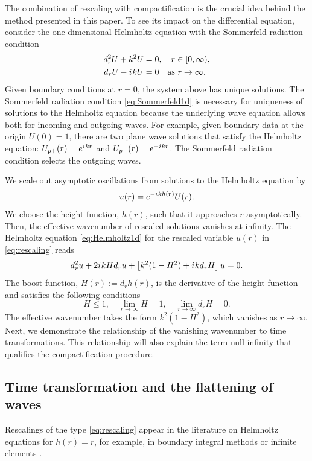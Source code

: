 \documentclass[draft,onefignum,onetabnum]{siamart190516}
\newcommand{\be}{\begin{equation}}
\newcommand{\ee}{\end{equation}}
\newcommand{\iu}{{i\mkern1mu}}
\begin{document}
The combination of rescaling with compactification is the crucial idea behind the method presented in this paper. To see its impact on the differential equation, consider the one-dimensional Helmholtz equation with the Sommerfeld radiation condition
\begin{align}
\label {eq:Helmholtz1d} d_r^2 U + k^2 U &= 0, \quad r\in[0,\infty),\\
\label{eq:Sommerfeld1d}d_r U - \iu k U &= 0 \quad \mathrm{as} \ r\to\infty.
\end{align}
Given boundary conditions at $r=0$, the system above has unique solutions. The Sommerfeld radiation condition \eqref{eq:Sommerfeld1d} is necessary for uniqueness of solutions to the Helmholtz equation because the underlying wave equation allows both for incoming and outgoing waves. For example, given boundary data at the origin $U(0)=1$, there are two plane wave solutions that satisfy the Helmholtz equation: $U_{p+}(r) = e^{\iu k r}$ and $U_{p-}(r) = e^{-\iu k r}$. The Sommerfeld radiation condition selects the outgoing waves.

We scale out asymptotic oscillations from solutions to the Helmholtz equation by
\be\label{eq:rescaling} u(r) = e^{-\iu k h(r)} U(r).\ee
We choose the height function, $h(r)$, such that it approaches $r$ asymptotically. Then, the effective wavenumber of rescaled solutions vanishes at infinity. The Helmholtz equation \eqref{eq:Helmholtz1d} for the rescaled variable $u(r)$ in \eqref{eq:rescaling} reads
\be\label{eq:resc_helm}
d_r^2 u + 2 \iu k H d_r u + \left[ k^2 (1-H^2) + \iu k d_r H\right] u = 0.
\ee
The boost function, $H(r) :=d_r h(r)$, is the derivative of the height function and satisfies the following conditions \cite{Zenginoglu08, ZengFramework, jaramillo2021pseudospectrum}
\be \label{eq:h_cond}
	H \leq 1, \quad \lim_{r\to\infty} H = 1, \quad \lim_{r\to\infty} d_r H = 0.
\ee
The effective wavenumber takes the form $k^2(1-H^2)$, which vanishes as $r\to\infty$. Next, we demonstrate the relationship of the vanishing wavenumber to time transformations. This relationship will also explain the term null infinity that qualifies the compactification procedure.

\subsection{Time transformation and the flattening of waves} 
Rescalings of the type \eqref{eq:rescaling} appear in the literature on Helmholtz equations for $h(r)=r$, for example, in boundary integral methods \cite{chandler2012numerical} or infinite elements \cite{demkowicz2006few}.
\end{document}
